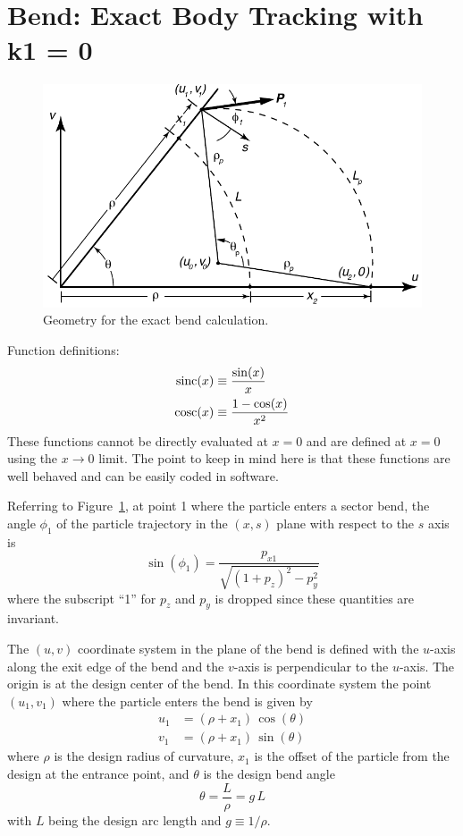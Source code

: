\section{Bend: Exact Body Tracking with k1 = 0}
\label{s:bend.body.std}

\begin{figure}[h]
  \centering
  \includegraphics[width=5in]{bend-exact.pdf}
  \caption{Geometry for the exact bend calculation.}
  \label{f:bend.exact}
\end{figure}


Function definitions:
\begin{align}
  \text{sinc}(x) &\equiv \frac{\sin(x)}{x} \\
  \text{cosc}(x) &\equiv \frac{1 - \cos(x)}{x^2}
\end{align}
These functions cannot be directly evaluated at $x = 0$ and are defined at $x = 0$ using the $x
\rightarrow 0$ limit. The point to keep in mind here is that these functions are well behaved and
can be easily coded in software.

Referring to Figure~\ref{f:bend.exact}, at point 1 where the particle enters a sector bend, the angle
$\phi_1$ of the particle trajectory in the $(x,s)$ plane with respect to the $s$ axis is
\begin{equation}
  \sin(\phi_1) = \frac{p_{x1}}{\sqrt{(1+p_z)^2 - p_y^2}}
\end{equation}
where the subscript ``1'' for $p_z$ and $p_y$ is dropped since these quantities are invariant.

The $(u,v)$ coordinate system in the plane of the bend is defined with the $u$-axis along the exit
edge of the bend and the $v$-axis is perpendicular to the $u$-axis. The origin is at the design
center of the bend. In this coordinate system the point $(u_1, v_1)$ where the particle enters the
bend is given by
\begin{align}
  u_1 &= (\rho + x_1) \, \cos(\theta) \\
  v_1 &= (\rho + x_1) \, \sin(\theta)
\end{align}
where $\rho$ is the design radius of curvature, $x_1$ is the offset of the particle from the design
at the entrance point, and $\theta$ is the design bend angle
\begin{equation}
  \theta = \frac{L}{\rho} = g \, L
\end{equation}
with $L$ being the design arc length and $g \equiv 1/\rho$.

